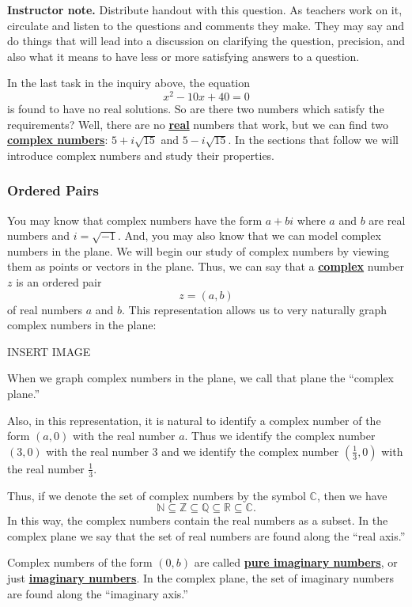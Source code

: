 \documentclass[11pt]{article}
\newcommand\smallnote[1]
	{\begin{mdframed}\raggedright  {\bf Instructor note.} {#1} \end{mdframed}}
\renewcommand\emph[1]{\underline{\bf{#1}}} %
\theoremstyle{definition}
\begin{document}
\smallnote{
Distribute handout with this question. As teachers work on it, circulate and listen to the questions and comments they make. They may say and do things that will lead into a discussion on clarifying the question, precision, and also what it means to have less or more satisfying answers to a question.
}

In the last task in the inquiry above, the equation
\[ x^2 - 10x + 40 = 0\]
is found to have no real solutions. So are there two numbers which satisfy the requirements?  Well, there are no \emph{real} numbers that work, but
we can find two \emph{complex numbers}: $5 + i\sqrt{15}$ and $5-i\sqrt{15}$. In the sections that follow we will introduce complex numbers and study their 
properties.

\subsubsection{Ordered Pairs}

You may know that complex numbers have the form $a + bi$ where $a$ and $b$ are real numbers and $i = \sqrt{-1}$. And, you may also know that we can model 
complex numbers in the plane. We will begin our study of complex numbers by viewing them as points or vectors in the plane. Thus, we can say that a 
\emph{complex} number $z$ is an ordered pair
\[ z = (a,b)\]
of real numbers $a$ and $b$. This representation allows us to very naturally graph complex numbers in the plane:

\begin{center}
  INSERT IMAGE
\end{center}

When we graph complex numbers in the plane, we call that plane the ``complex plane.''

Also, in this representation, it is natural to identify a complex number of the form $(a,0)$ with the real number $a$. Thus we identify the complex number
$(3,0)$ with the real number 3 and we identify the complex number $\left( \frac{1}{3},0 \right)$ with the real number $\frac{1}{3}$. 

Thus, if we denote the set of complex numbers by the symbol $\mathbb{C}$, then we have
\[ \mathbb{N} \subseteq \mathbb{Z} \subseteq \mathbb{Q} \subseteq \mathbb{R} \subseteq \mathbb{C}.\]
In this way, the complex numbers contain the real numbers as a subset. In the complex plane we say that the set of real numbers are found along the ``real axis.''

Complex numbers of the form $(0,b)$ are called \emph{pure imaginary numbers}, or just \emph{imaginary numbers}. In the complex plane, the set of imaginary numbers
are found along the ``imaginary axis.''
\end{document}
